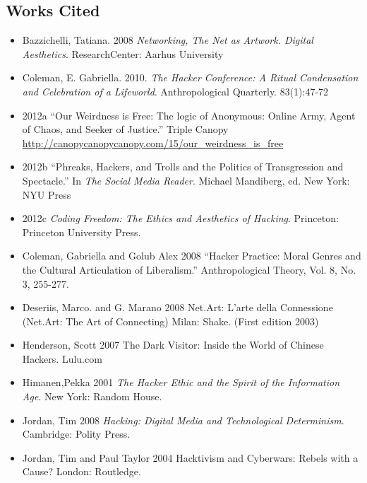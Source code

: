 \documentclass[letterpaper,12pt,english]{sphinxmanual}
\begin{document}
\subsection{Works Cited}
\label{preface:works-cited}\begin{itemize}
\item {} 
Bazzichelli, Tatiana. 2008 \emph{Networking, The Net as Artwork. Digital Aesthetics}. ResearchCenter: Aarhus University

\item {} 
Coleman, E. Gabriella. 2010. \emph{The Hacker Conference: A Ritual Condensation and Celebration of a Lifeworld}. Anthropological Quarterly. 83(1):47-72

\item {} 
2012a ``Our Weirdness is Free: The logic of Anonymous: Online Army, Agent of Chaos, and Seeker of Justice.'' Triple Canopy \url{http://canopycanopycanopy.com/15/our\_weirdness\_is\_free}

\item {} 
2012b ``Phreaks, Hackers, and Trolls and the Politics of Transgression and Spectacle.'' In \emph{The Social Media Reader}. Michael Mandiberg, ed. New York: NYU Press

\item {} 
2012c \emph{Coding Freedom: The Ethics and Aesthetics of Hacking}. Princeton: Princeton University Press.

\item {} 
Coleman, Gabriella and Golub Alex 2008 ``Hacker Practice: Moral Genres and the Cultural Articulation of Liberalism.” Anthropological Theory, Vol. 8, No. 3, 255-277.

\item {} 
Deseriis, Marco. and G. Marano 2008 Net.Art: L’arte della Connessione (Net.Art: The Art of Connecting) Milan: Shake. (First edition 2003)

\item {} 
Henderson, Scott 2007 The Dark Visitor: Inside the World of Chinese Hackers. Lulu.com

\item {} 
Himanen,Pekka 2001 \emph{The Hacker Ethic and the Spirit of the Information Age}. New York: Random House.

\item {} 
Jordan, Tim 2008 \emph{Hacking: Digital Media and Technological Determinism}. Cambridge: Polity Press.

\item {} 
Jordan, Tim and Paul Taylor 2004 Hacktivism and Cyberwars: Rebels with a Cause? London: Routledge.


\end{itemize}
\end{document}
